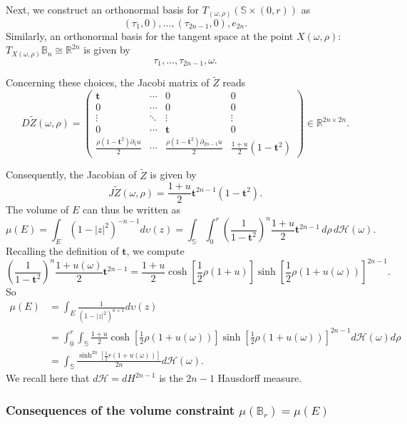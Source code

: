 \documentclass[11pt]{amsart}
\numberwithin{equation}{section}
\begin{document}
Next, we construct an orthonormal basis for \(T_{(\omega, \rho)} (\mathbb{S} \times (0, r))\) as
\[
(\tau_1, 0), \dots, (\tau_{2n-1}, 0), e_{2n}.
\]
Similarly, an orthonormal basis for the tangent space at the point $X(\omega, \rho)$: \(T_{X(\omega, \rho)} \mathbb{B}_n \cong \mathbb{R}^{2n}\) is given by
\[
\tau_1, \dots, \tau_{2n-1}, \omega.
\]

Concerning  these choices, the Jacobi matrix of $\tilde{Z}$ reads
\[
D\tilde{Z}(\omega, \rho) =
\begin{pmatrix}
\mathbf{t} & \cdots  & 0 & 0 \\
0 & \cdots  & 0 & 0 \\
\vdots  & \ddots & \vdots & \vdots \\
0 & \cdots  & \mathbf{t} & 0 \\
\frac{\rho(1-\mathbf{t}^2) \partial_1 u}{2}  & \cdots & \frac{\rho(1-\mathbf{t}^2) \partial_{2n-1} u}{2} & \frac{1+u}{2}(1-\mathbf{t}^2)
\end{pmatrix} \in \mathbb{R}^{2n \times 2n}.
\]

Consequently, the Jacobian of $\tilde{Z}$ is given by
\begin{equation}\label{ztil}
J\tilde{Z}(\omega, \rho) = \frac{1 + u}{2} \mathbf{t}^{2n-1} (1 - \mathbf{t}^2).
\end{equation}
The volume of $E$ can thus be written as
\[
\mu(E) = \int_E \left(1 - |z|^2\right)^{-n-1} d\upsilon(z) = \int_{\mathbb{S}} \int_0^{r} \left(\frac{1}{1 - \mathbf{t}^2}\right)^n \frac{1 + u}{2} \mathbf{t}^{2n-1}  \, d\rho \, d\mathcal{H}(\omega).
\]
Recalling the definition of $\mathbf{t}$, we compute
\[
\left(\frac{1}{1 - \mathbf{t}^2}\right)^n \frac{1 + u(\omega)}{2} \mathbf{t}^{2n-1} = \frac{1+u}{2}\cosh\left[\frac{1}{2} \rho (1+u)\right] \sinh\left[\frac{1}{2} \rho (1+u(\omega))\right]^{2n-1}.
\]
So \[\begin{split}\mu(E) &= \int_{E}\frac{1}{(1-|z|^2)^{n+1}}d\upsilon(z)\\&=\int_0^{r}\int_{\mathbb{S}}\frac{1+u}{2}\cosh\left[\frac{1}{2} \rho (1+u(\omega))\right] \sinh\left[\frac{1}{2} \rho (1+u(\omega))\right]^{2n-1}d\mathcal{H}(\omega)d\rho
\\&=\int_{\mathbb{S}}\frac{\sinh^{2n}\left[\frac{1}{2} r (1+u(\omega))\right]}{2n}d\mathcal{H}(\omega).\end{split}\] We recall here that $d\mathcal{H}=dH^{2n-1}$ is the $2n-1$ Hausdorff  measure.
\subsubsection{Consequences of the volume constraint $\mu(\mathbb{B}_r)=\mu  (E)$}
\end{document}
